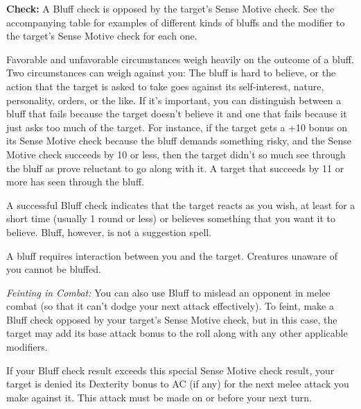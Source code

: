 \textbf{Check:} A Bluff check is opposed by the target’s Sense Motive check. See the accompanying table for examples of different kinds of bluffs and the modifier to the target’s Sense Motive check for each one.

Favorable and unfavorable circumstances weigh heavily on the outcome of a bluff. Two circumstances can weigh against you: The bluff is hard to believe, or the action that the target is asked to take goes against its self-interest, nature, personality, orders, or the like. If it’s important, you can distinguish between a bluff that fails because the target doesn’t believe it and one that fails because it just asks too much of the target. For instance, if the target gets a +10 bonus on its Sense Motive check because the bluff demands something risky, and the Sense Motive check succeeds by 10 or less, then the target didn’t so much see through the bluff as prove reluctant to go along with it. A target that succeeds by 11 or more has seen through the bluff.

A successful Bluff check indicates that the target reacts as you wish, at least for a short time (usually 1 round or less) or believes something that you want it to believe. Bluff, however, is not a suggestion spell.

A bluff requires interaction between you and the target. Creatures unaware of you cannot be bluffed.


\textit{Feinting in Combat:} You can also use Bluff to mislead an opponent in melee combat (so that it can’t dodge your next attack effectively). To feint, make a Bluff check opposed by your target’s Sense Motive check, but in this case, the target may add its base attack bonus to the roll along with any other applicable modifiers.

If your Bluff check result exceeds this special Sense Motive check result, your target is denied its Dexterity bonus to AC (if any) for the next melee attack you make against it. This attack must be made on or before your next turn.

